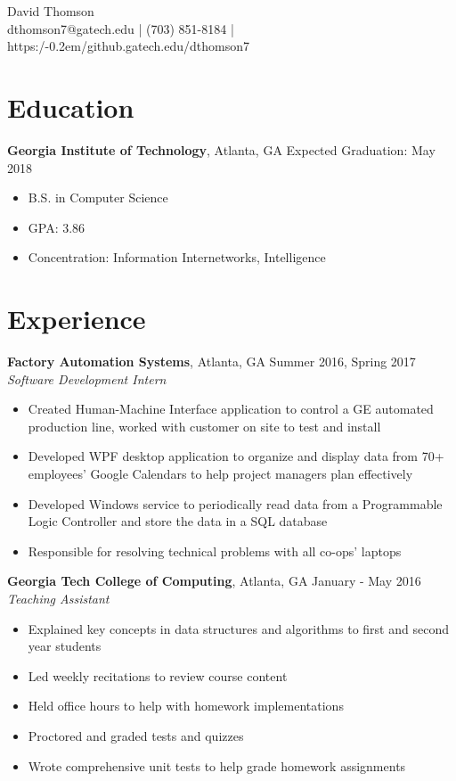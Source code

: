 \documentclass[10pt]{article}
\newcommand{\twobar}{/\kern-0.2em/}
\newcommand{\pipe}{| }
\begin{document}
\begin{center}
\vspace*{0.3em}
{\huge David Thomson} \\
\vspace*{1em}
dthomson7@gatech.edu \pipe (703) 851-8184 \pipe https:\twobar{}github.gatech.edu/dthomson7
\end{center}

\section*{Education}
\textbf{Georgia Institute of Technology}, Atlanta, GA \hfill Expected Graduation: May 2018
\begin{itemize}
    \item B.S. in Computer Science
    \item GPA: 3.86
    \item Concentration: Information Internetworks, Intelligence
\end{itemize}

\section*{Experience}
\textbf{Factory Automation Systems}, Atlanta, GA \hfill Summer 2016, Spring 2017
\linebreak
\textit{Software Development Intern}
\begin{itemize}
    \item Created Human-Machine Interface application to control a GE automated production line, worked with customer on site to test and install
    \item Developed WPF desktop application to organize and display data from 70+ employees' Google Calendars to help project managers plan effectively
    \item Developed Windows service to periodically read data from a Programmable Logic Controller and store the data in a SQL database
    \item Responsible for resolving technical problems with all co-ops' laptops
\end{itemize}

\vspace{3pt}

\textbf{Georgia Tech College of Computing}, Atlanta, GA \hfill January - May 2016
\linebreak
\textit{Teaching Assistant}
\begin{itemize}
    \item Explained key concepts in data structures and algorithms to first and second year students
    \item Led weekly recitations to review course content
    \item Held office hours to help with homework implementations
    \item Proctored and graded tests and quizzes
    \item Wrote comprehensive unit tests to help grade homework assignments
\end{itemize}
\end{document}
